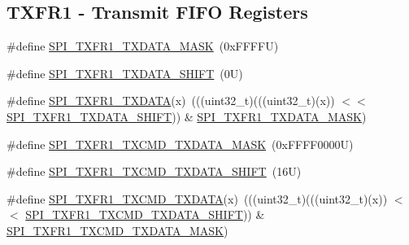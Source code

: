 \subsection*{T\+X\+F\+R1 -\/ Transmit F\+I\+FO Registers}
\begin{DoxyCompactItemize}
\item 
\#define \mbox{\hyperlink{group___s_p_i___register___masks_ga1264b5c9bd3d50782925741457405b2d}{S\+P\+I\+\_\+\+T\+X\+F\+R1\+\_\+\+T\+X\+D\+A\+T\+A\+\_\+\+M\+A\+SK}}~(0x\+F\+F\+F\+F\+U)
\item 
\#define \mbox{\hyperlink{group___s_p_i___register___masks_ga15dd2d0a8568bc36fed73be8a4cb24a0}{S\+P\+I\+\_\+\+T\+X\+F\+R1\+\_\+\+T\+X\+D\+A\+T\+A\+\_\+\+S\+H\+I\+FT}}~(0\+U)
\item 
\#define \mbox{\hyperlink{group___s_p_i___register___masks_ga7f5fddb0dfde74876bf4b6ff4603dd56}{S\+P\+I\+\_\+\+T\+X\+F\+R1\+\_\+\+T\+X\+D\+A\+TA}}(x)~(((uint32\+\_\+t)(((uint32\+\_\+t)(x)) $<$$<$ \mbox{\hyperlink{group___s_p_i___register___masks_ga15dd2d0a8568bc36fed73be8a4cb24a0}{S\+P\+I\+\_\+\+T\+X\+F\+R1\+\_\+\+T\+X\+D\+A\+T\+A\+\_\+\+S\+H\+I\+FT}})) \& \mbox{\hyperlink{group___s_p_i___register___masks_ga1264b5c9bd3d50782925741457405b2d}{S\+P\+I\+\_\+\+T\+X\+F\+R1\+\_\+\+T\+X\+D\+A\+T\+A\+\_\+\+M\+A\+SK}})
\item 
\#define \mbox{\hyperlink{group___s_p_i___register___masks_ga03437d9c36165cd76cc1b649bc61fdcd}{S\+P\+I\+\_\+\+T\+X\+F\+R1\+\_\+\+T\+X\+C\+M\+D\+\_\+\+T\+X\+D\+A\+T\+A\+\_\+\+M\+A\+SK}}~(0x\+F\+F\+F\+F0000\+U)
\item 
\#define \mbox{\hyperlink{group___s_p_i___register___masks_ga0240ff4345642a5bca2308c670c5a980}{S\+P\+I\+\_\+\+T\+X\+F\+R1\+\_\+\+T\+X\+C\+M\+D\+\_\+\+T\+X\+D\+A\+T\+A\+\_\+\+S\+H\+I\+FT}}~(16\+U)
\item 
\#define \mbox{\hyperlink{group___s_p_i___register___masks_ga7aee126ae71c905a5041e9313be0bbea}{S\+P\+I\+\_\+\+T\+X\+F\+R1\+\_\+\+T\+X\+C\+M\+D\+\_\+\+T\+X\+D\+A\+TA}}(x)~(((uint32\+\_\+t)(((uint32\+\_\+t)(x)) $<$$<$ \mbox{\hyperlink{group___s_p_i___register___masks_ga0240ff4345642a5bca2308c670c5a980}{S\+P\+I\+\_\+\+T\+X\+F\+R1\+\_\+\+T\+X\+C\+M\+D\+\_\+\+T\+X\+D\+A\+T\+A\+\_\+\+S\+H\+I\+FT}})) \& \mbox{\hyperlink{group___s_p_i___register___masks_ga03437d9c36165cd76cc1b649bc61fdcd}{S\+P\+I\+\_\+\+T\+X\+F\+R1\+\_\+\+T\+X\+C\+M\+D\+\_\+\+T\+X\+D\+A\+T\+A\+\_\+\+M\+A\+SK}})
\end{DoxyCompactItemize}
